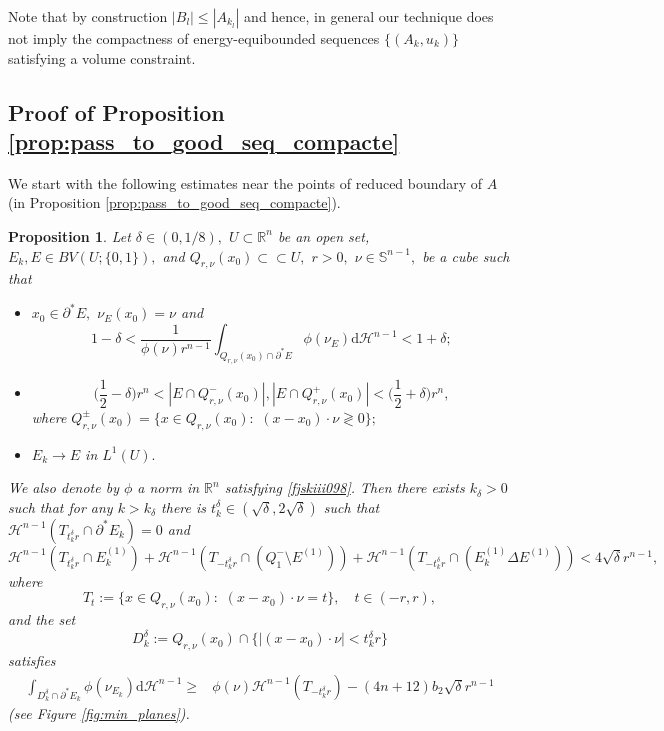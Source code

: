\documentclass[reqno]{amsart}
\numberwithin{equation}{section}
\theoremstyle{plain}
\newtheorem{proposition}[theorem]{Proposition}
\theoremstyle{definition}
\newcommand{\R}{\mathbb{R}}
\renewcommand{\S}{\mathbb{S}}
\newcommand{\cH}{\mathcal{H}}
\newcommand{\p}{\partial}
\newcommand{\bound}{b}
\renewcommand{\d}{\mathrm{d}}
\newcommand{\strictlyincluded}{\subset\subset}
\begin{document}
Note that by construction $|B_l|\le |A_{k_l}|$ and hence, in general our technique does not imply the compactness of energy-equibounded sequences $\{(A_k,u_k)\}$ satisfying a volume constraint.
 

\subsection{Proof of Proposition \ref{prop:pass_to_good_seq_compacte}}


We start with the following estimates near the points of reduced boundary of $A$ (in Proposition \ref{prop:pass_to_good_seq_compacte}).

\begin{proposition}\label{prop:estimate_red_boundary}
Let $\delta\in(0,1/8),$ $U\subset \R^n$ be an open set, $E_k,E\in BV(U;\{0,1\}),$ and $Q_{r,\nu}(x_0)\strictlyincluded U,$ $r>0,$ $\nu\in\S^{n-1},$ be a cube such that 
\begin{itemize}
\item[\rm(a1)] $x_0\in \p^*E,$ $\nu_E(x_0)=\nu$ and
$$
1-\delta < \frac{1}{\phi(\nu)r^{n-1}} \int_{Q_{r,\nu}(x_0)\cap \p^*E}\phi(\nu_E)\d\cH^{n-1} < 1+\delta;
$$

\item[\rm(a2)] 
$$
\Big(\frac12-\delta\Big)r^n <|E\cap Q_{r,\nu}^-(x_0)|, |E\cap Q_{r,\nu}^+(x_0)| < \Big(\frac12+\delta\Big)r^n,
$$ 
where 
$
Q_{r,\nu}^\pm(x_0) =\{x\in Q_{r,\nu}(x_0):\,\, (x-x_0)\cdot\nu \gtrless0\};
$

\item[\rm(a3)] $E_k\to E$ in $L^1(U).$
\end{itemize}
%
\noindent
We also denote by $\phi$ a norm in $\R^n$ satisfying \eqref{fjskiii098}. 
Then there exists $k_\delta>0$ such that for any $k>k_\delta$ there is $t_k^\delta\in(\sqrt{\delta},2\sqrt{\delta})$ such that $\cH^{n-1}(T_{t_k^\delta r}\cap \p^* E_k) = 0$ and
$$
\cH^{n-1}(T_{t_k^\delta r}\cap E_k^{(1)}) + \cH^{n-1}(T_{-t_k^\delta r}\cap(Q_1^-\setminus  E^{(1)})) + \cH^{n-1}(T_{-t_k^\delta r}\cap (E_k^{(1)}\Delta E^{(1)})) <4\sqrt{\delta}r^{n-1},
$$
where
$$
T_t:=\{x\in Q_{r,\nu}(x_0):\,\, (x-x_0)\cdot\nu =t\},\quad t\in(-r,r),
$$
and  the set 
$$
D_k^\delta:=Q_{r,\nu}(x_0)\cap \{|(x-x_0)\cdot\nu|<t_k^\delta r\}
$$
satisfies  
%
\begin{align*}
\int_{D_k^\delta\cap \p^*E_k} \phi(\nu_{E_k})\d\cH^{n-1} 
\ge & \phi(\nu)\cH^{n-1}(T_{-t_k^\delta r})-  (4n +12) \bound_2\sqrt{\delta}r^{n-1}
\end{align*}
(see Figure \ref{fig:min_planes}).
\end{proposition}
\end{document}
